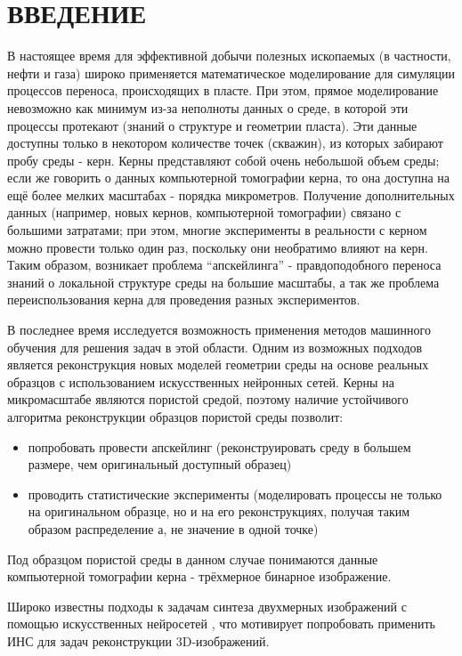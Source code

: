 \clearpage
\section*{\hfil ВВЕДЕНИЕ \hfil}
	
	В настоящее время для эффективной добычи полезных ископаемых (в частности, нефти и газа) широко применяется математическое моделирование для симуляции процессов переноса, происходящих в пласте. При этом, прямое моделирование невозможно как минимум из-за неполноты данных о среде, в которой эти процессы протекают (знаний о структуре и геометрии пласта). Эти данные доступны только в некотором количестве точек (скважин), из которых забирают пробу среды - керн. Керны представляют собой очень небольшой объем среды; если же говорить о данных компьютерной томографии керна, то она доступна на ещё более мелких масштабах - порядка микрометров. Получение дополнительных данных (например, новых кернов, компьютерной томографии) связано с большими затратами; при этом, многие эксперименты в реальности с керном можно провести только один раз, поскольку они необратимо влияют на керн. Таким образом, возникает проблема ``апскейлинга'' - правдоподобного переноса знаний о локальной структуре среды на большие масштабы, а так же проблема переиспользования керна для проведения разных экспериментов.
	
	В последнее время исследуется возможность применения методов машинного обучения для решения задач в этой области. Одним из возможных подходов является реконструкция новых моделей геометрии среды на основе реальных образцов с использованием искусственных нейронных сетей. Керны на микромасштабе являются пористой средой, поэтому наличие устойчивого алгоритма реконструкции образцов пористой среды позволит:
	
	\begin{itemize}
		\item попробовать провести апскейлинг (реконструировать среду в большем размере, чем оригинальный доступный образец)
		\item проводить статистические эксперименты (моделировать процессы не только на оригинальном образце, но и на его реконструкциях, получая таким образом распределение а, не значение в одной точке)
	\end{itemize}

	
	Под образцом пористой среды в данном случае понимаются данные компьютерной томографии керна - трёхмерное бинарное изображение.
	
	Широко известны подходы к задачам синтеза двухмерных изображений с помощью искусственных нейросетей \cite{Gatys, Ulyanov}, что мотивирует попробовать применить ИНС для задач реконструкции 3D-изображений.
	
